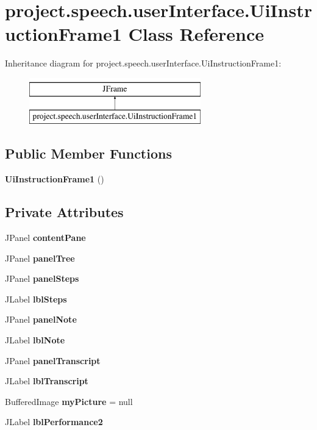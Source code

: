 \section{project.\+speech.\+user\+Interface.\+Ui\+Instruction\+Frame1 Class Reference}
\label{classproject_1_1speech_1_1user_interface_1_1_ui_instruction_frame1}
Inheritance diagram for project.\+speech.\+user\+Interface.\+Ui\+Instruction\+Frame1\+:\begin{figure}[H]
\begin{center}
\leavevmode
\includegraphics[height=2.000000cm]{classproject_1_1speech_1_1user_interface_1_1_ui_instruction_frame1}
\end{center}
\end{figure}
\subsection*{Public Member Functions}
\begin{DoxyCompactItemize}
\item 
{\bf Ui\+Instruction\+Frame1} ()
\end{DoxyCompactItemize}
\subsection*{Private Attributes}
\begin{DoxyCompactItemize}
\item 
J\+Panel {\bf content\+Pane}
\item 
J\+Panel {\bf panel\+Tree}
\item 
J\+Panel {\bf panel\+Steps}
\item 
J\+Label {\bf lbl\+Steps}
\item 
J\+Panel {\bf panel\+Note}
\item 
J\+Label {\bf lbl\+Note}
\item 
J\+Panel {\bf panel\+Transcript}
\item 
J\+Label {\bf lbl\+Transcript}
\item 
Buffered\+Image {\bf my\+Picture} = null
\item 
J\+Label {\bf lbl\+Performance2}
\end{DoxyCompactItemize}


